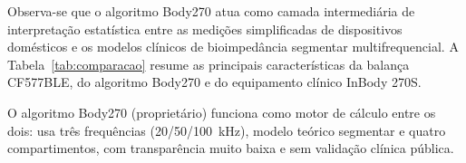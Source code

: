 Observa-se que o algoritmo Body270 atua como camada intermediária de interpretação
estatística entre as medições simplificadas de dispositivos domésticos e os modelos clínicos
de bioimpedância segmentar multifrequencial. A Tabela~\ref{tab:comparacao} resume as
principais características da balança CF577BLE, do algoritmo Body270 e do equipamento clínico
InBody 270S.


O algoritmo Body270 (proprietário) funciona como motor de cálculo entre os dois: usa três
frequências (20/50/100~kHz), modelo teórico segmentar e quatro compartimentos, com
transparência muito baixa e sem validação clínica pública.
